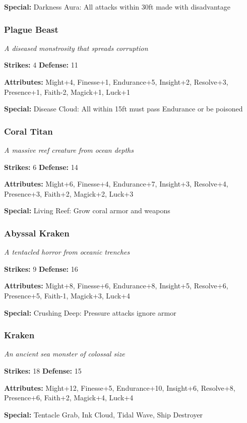 \documentclass[10pt,twoside]{article}
\begin{document}
\textbf{Special:} Darkness Aura: All attacks within 30ft made with disadvantage

\subsubsection{Plague Beast}
\textit{A diseased monstrosity that spreads corruption}

\textbf{Strikes:} 4 \quad \textbf{Defense:} 11

\textbf{Attributes:} Might+4, Finesse+1, Endurance+5, Insight+2, Resolve+3, Presence+1, Faith-2, Magick+1, Luck+1

\textbf{Special:} Disease Cloud: All within 15ft must pass Endurance or be poisoned

\subsubsection{Coral Titan}
\textit{A massive reef creature from ocean depths}

\textbf{Strikes:} 6 \quad \textbf{Defense:} 14

\textbf{Attributes:} Might+6, Finesse+4, Endurance+7, Insight+3, Resolve+4, Presence+3, Faith+2, Magick+2, Luck+3

\textbf{Special:} Living Reef: Grow coral armor and weapons

\subsubsection{Abyssal Kraken}
\textit{A tentacled horror from oceanic trenches}

\textbf{Strikes:} 9 \quad \textbf{Defense:} 16

\textbf{Attributes:} Might+8, Finesse+6, Endurance+8, Insight+5, Resolve+6, Presence+5, Faith-1, Magick+3, Luck+4

\textbf{Special:} Crushing Deep: Pressure attacks ignore armor

\subsubsection{Kraken}
\textit{An ancient sea monster of colossal size}

\textbf{Strikes:} 18 \quad \textbf{Defense:} 15

\textbf{Attributes:} Might+12, Finesse+5, Endurance+10, Insight+6, Resolve+8, Presence+6, Faith+2, Magick+4, Luck+4

\textbf{Special:} Tentacle Grab, Ink Cloud, Tidal Wave, Ship Destroyer
\end{document}
